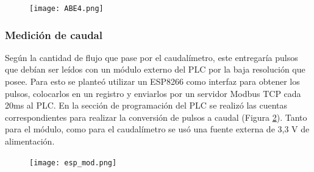 \begin{figure}[H]
	\centering
	\texttt{[image: ABE4.png]}
	\label{fig:ABE4}
\end{figure}

\subsubsection{Medición de caudal}
Según la cantidad de flujo que pase por el caudalímetro, este entregaría pulsos que debían ser leídos con un módulo externo del PLC por la baja resolución que posee. Para esto se planteó utilizar un ESP8266 como interfaz para obtener los pulsos, colocarlos en un registro y enviarlos por un servidor Modbus TCP cada 20ms al PLC. En la sección de programación del PLC se realizó las cuentas correspondientes para realizar la conversión de pulsos a caudal (Figura \ref{fig:modtcp}). Tanto para el módulo, como para el caudalímetro se usó una fuente externa de 3,3 V de alimentación.
\begin{figure}[htbp]
	\centering
	\texttt{[image: esp\_mod.png]}
	\label{fig:modtcp}
\end{figure}
\newpage

